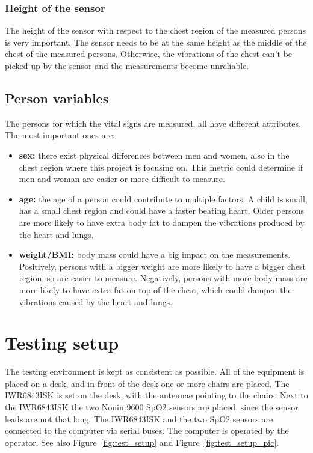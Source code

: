 \subsubsection{Height of the sensor}
The height of the sensor with respect to the chest region of the measured persons is very important. The sensor needs to be at the same height as the middle of the chest of the measured persons. Otherwise, the vibrations of the chest can't be picked up by the sensor and the measurements become unreliable.

\subsection{Person variables}
\label{sec:person_metrics}
The persons for which the vital signs are measured, all have different attributes. The most important ones are:

\begin{itemize}
    \item \textbf{sex:} there exist physical differences between men and women, also in the chest region where this project is focusing on. This metric could determine if men and woman are easier or more difficult to measure.
    \item \textbf{age:} the age of a person could contribute to multiple factors. A child is small, has a small chest region and could have a faster beating heart. Older persons are more likely to have extra body fat to dampen the vibrations produced by the heart and lungs.
    \item \textbf{weight/BMI:} body mass could have a big impact on the measurements. Positively, persons with a bigger weight are more likely to have a bigger chest region, so are easier to measure. Negatively, persons with more body mass are more likely to have extra fat on top of the chest, which could dampen the vibrations caused by the heart and lungs.
\end{itemize}

\section{Testing setup}
\label{sec:test_setup}
The testing environment is kept as consistent as possible. All of the equipment is placed on a desk, and in front of the desk one or more chairs are placed. The IWR6843ISK is set on the desk, with the antennae pointing to the chairs. Next to the IWR6843ISK the two Nonin 9600 SpO2 sensors are placed, since the sensor leads are not that long. The IWR6843ISK and the two SpO2 sensors are connected to the computer via serial buses. The computer is operated by the operator. See also Figure~\ref{fig:test_setup} and Figure~\ref{fig:test_setup_pic}.

